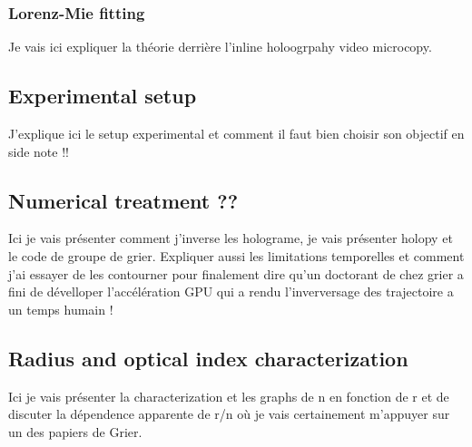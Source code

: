 \subsubsection{Lorenz-Mie fitting}
Je vais ici expliquer la théorie derrière l'inline holoogrpahy video microcopy.

\subsection{Experimental setup}
J'explique ici le setup experimental et comment il faut bien choisir son objectif en side note !!

\subsection{Numerical treatment ??}

Ici je vais présenter comment j'inverse les holograme, je vais présenter holopy et le code de groupe de grier. Expliquer aussi les limitations temporelles et comment j'ai essayer de les contourner pour finalement dire qu'un doctorant de chez grier a fini de dévelloper l'accélération GPU qui a rendu l'inverversage des trajectoire a un temps humain !

\subsection{Radius and optical index characterization}


Ici je vais présenter la characterization et les graphs de n en fonction de r et de discuter la dépendence apparente de r/n où je vais certainement m'appuyer sur un des papiers de Grier. 

